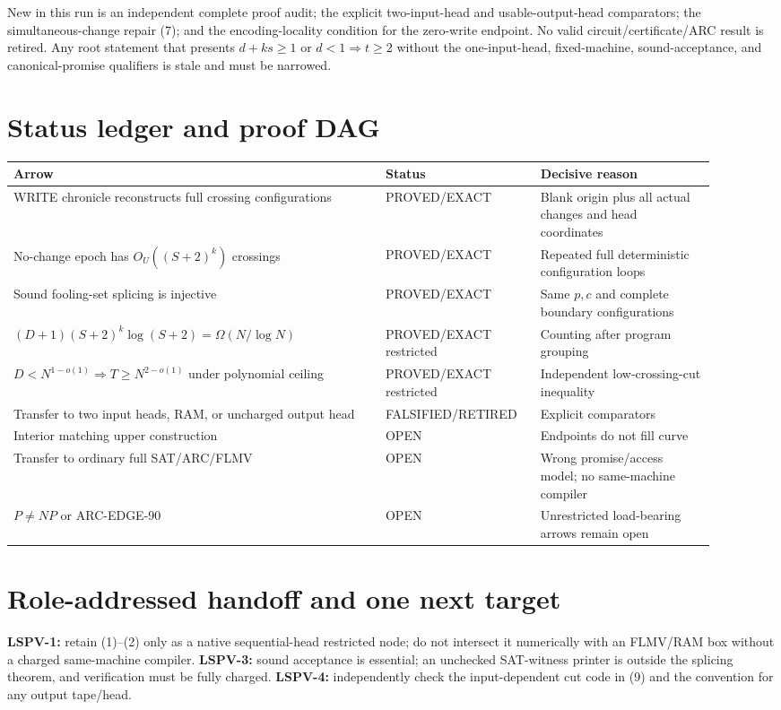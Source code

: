 \documentclass[11pt]{article}
\begin{document}
New in this run is an independent complete proof audit; the explicit
two-input-head and usable-output-head comparators; the simultaneous-change
repair (7); and the encoding-locality condition for the zero-write endpoint.
No valid circuit/certificate/ARC result is retired.  Any root statement that
presents $d+ks\ge1$ or $d<1\Rightarrow t\ge2$ without the one-input-head,
fixed-machine, sound-acceptance, and canonical-promise qualifiers is stale and
must be narrowed.

\section{Status ledger and proof DAG}
\begin{center}
\begin{tabular}{p{0.49\linewidth}p{0.19\linewidth}p{0.23\linewidth}}
\toprule
Arrow & Status & Decisive reason \\
\midrule
WRITE chronicle reconstructs full crossing configurations & PROVED/EXACT &
Blank origin plus all actual changes and head coordinates\\
No-change epoch has $O_U((S+2)^k)$ crossings & PROVED/EXACT & Repeated full
deterministic configuration loops\\
Sound fooling-set splicing is injective & PROVED/EXACT & Same $p,c$ and complete
boundary configurations\\
$(D+1)(S+2)^k\log(S+2)=\Omega(N/\log N)$ & PROVED/EXACT restricted & Counting
after program grouping\\
$D<N^{1-o(1)}\Rightarrow T\ge N^{2-o(1)}$ under polynomial ceiling &
PROVED/EXACT restricted & Independent low-crossing-cut inequality\\
Transfer to two input heads, RAM, or uncharged output head & FALSIFIED/RETIRED &
Explicit comparators\\
Interior matching upper construction & OPEN & Endpoints do not fill curve\\
Transfer to ordinary full SAT/ARC/FLMV & OPEN & Wrong promise/access model; no
same-machine compiler\\
$P\ne NP$ or ARC-EDGE-90 & OPEN & Unrestricted load-bearing arrows remain open\\
\bottomrule
\end{tabular}
\end{center}

\section{Role-addressed handoff and one next target}
\textbf{LSPV-1:} retain (1)--(2) only as a native sequential-head restricted
node; do not intersect it numerically with an FLMV/RAM box without a charged
same-machine compiler.  \textbf{LSPV-3:} sound acceptance is essential; an
unchecked SAT-witness printer is outside the splicing theorem, and verification
must be fully charged.  \textbf{LSPV-4:} independently check the input-dependent
cut code in (9) and the convention for any output tape/head.
\end{document}
